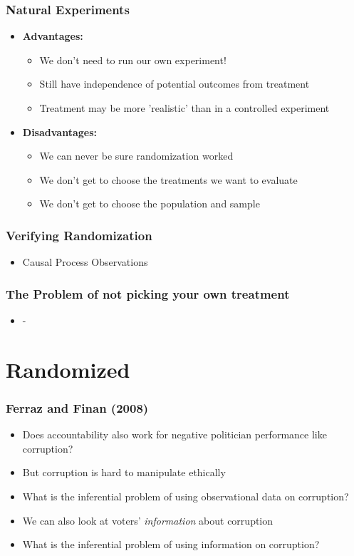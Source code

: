 \documentclass[xcolor=x11names,compress]{beamer}\usepackage[]{graphicx}\usepackage[]{color}
\renewcommand{\(}{\begin{columns}}
\renewcommand{\)}{\end{columns}}
\newcommand{\<}[1]{\begin{column}{#1}}
\renewcommand{\>}{\end{column}}
\begin{document}
\begin{frame}
\frametitle{Natural Experiments}
\begin{itemize}
\item \textbf{Advantages:}
\begin{itemize}
\item We don't need to run our own experiment!
\pause
\item Still have independence of potential outcomes from treatment
\pause
\item Treatment may be more 'realistic' than in a controlled experiment
\pause
\end{itemize}
\item \textbf{Disadvantages:}
\begin{itemize}
\item We can never be sure randomization worked
\pause
\item We don't get to choose the treatments we want to evaluate
\pause
\item We don't get to choose the population and sample
\end{itemize}
\end{itemize}
\end{frame}

\begin{frame}
\frametitle{Verifying Randomization}
\begin{itemize}
\item Causal Process Observations
\end{itemize}
\end{frame}

\begin{frame}
\frametitle{The Problem of not picking your own treatment}
\begin{itemize}
\item -
\end{itemize}
\end{frame}

\section{Randomized}

\begin{frame}
\frametitle{Ferraz and Finan (2008)}
\begin{itemize}
\item Does accountability also work for negative politician performance like corruption?
\pause
\item But corruption is hard to manipulate ethically
\pause
\item What is the inferential problem of using observational data on corruption?
\pause
\item We can also look at voters' \textit{information} about corruption 
\pause
\item What is the inferential problem of using information on corruption?
\end{itemize}
\end{frame}
\end{document}
